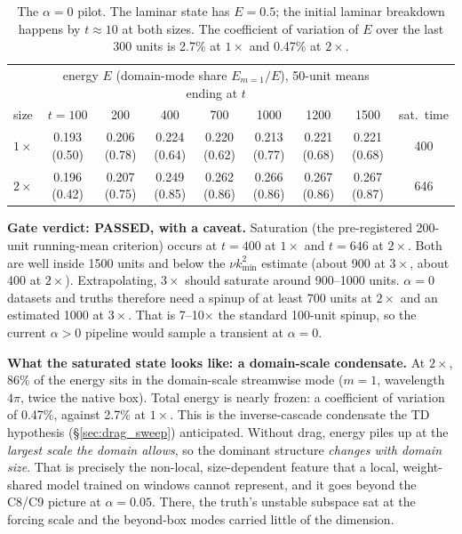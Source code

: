 \documentclass[11pt]{article}
\begin{document}
\begin{table}[h]
\centering
\small
\begin{tabular}{lcccccccc}
\toprule
 & \multicolumn{7}{c}{energy $E$ (domain-mode share $E_{m=1}/E$), 50-unit means ending at $t$} & \\
size & $t{=}100$ & 200 & 400 & 700 & 1000 & 1200 & 1500 & sat.\ time \\
\midrule
$1\times$ & 0.193 (0.50) & 0.206 (0.78) & 0.224 (0.64) & 0.220 (0.62) & 0.213 (0.77) & 0.221 (0.68) & 0.221 (0.68) & 400 \\
$2\times$ & 0.196 (0.42) & 0.207 (0.75) & 0.249 (0.85) & 0.262 (0.86) & 0.266 (0.86) & 0.267 (0.86) & 0.267 (0.87) & 646 \\
\bottomrule
\end{tabular}
\caption{The $\alpha{=}0$ pilot. The laminar state has $E{=}0.5$; the
initial laminar breakdown happens by $t\approx10$ at both sizes. The
coefficient of variation of $E$ over the last 300 units is 2.7\% at
$1\times$ and 0.47\% at $2\times$.}
\label{tab:alpha0}
\end{table}

\textbf{Gate verdict: PASSED, with a caveat.} Saturation (the
pre-registered 200-unit running-mean criterion) occurs at $t{=}400$ at
$1\times$ and $t{=}646$ at $2\times$. Both are well inside 1500 units
and below the $\nu k_{\min}^2$ estimate (about 900 at $3\times$, about
400 at $2\times$). Extrapolating, $3\times$ should saturate around
900--1000 units. $\alpha{=}0$ datasets and truths therefore need a
spinup of at least 700 units at $2\times$ and an estimated 1000 at
$3\times$. That is 7--10$\times$ the standard 100-unit spinup, so the
current $\alpha{>}0$ pipeline would sample a transient at $\alpha{=}0$.

\textbf{What the saturated state looks like: a domain-scale condensate.}
At $2\times$, 86\% of the energy sits in the domain-scale streamwise mode
($m{=}1$, wavelength $4\pi$, twice the native box). Total energy is
nearly frozen: a coefficient of variation of 0.47\%, against 2.7\% at
$1\times$. This is the inverse-cascade condensate the TD hypothesis
(\S\ref{sec:drag_sweep}) anticipated. Without drag, energy piles up at
the \emph{largest scale the domain allows}, so the dominant structure
\emph{changes with domain size}. That is precisely the non-local,
size-dependent feature that a local, weight-shared model trained on
windows cannot represent, and it goes beyond the C8/C9 picture at
$\alpha{=}0.05$. There, the truth's unstable subspace sat at the forcing
scale and the beyond-box modes carried little of the dimension.
\end{document}
